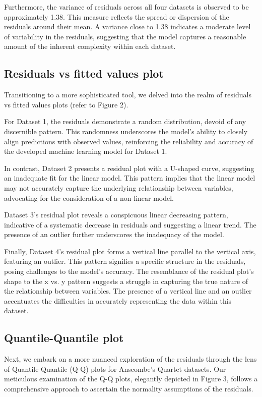 \documentclass[12pt,doublespace]{article}
\begin{document}
	Furthermore, the variance of residuals across all four datasets is observed to be approximately 1.38. This measure reflects the spread or dispersion of the residuals around their mean. A variance close to 1.38 indicates a moderate level of variability in the residuals, suggesting that the model captures a reasonable amount of the inherent complexity within each dataset. 
	
	\subsection{Residuals vs fitted values plot}
	Transitioning to a more sophisticated tool, we delved into the realm of residuals vs fitted values plots (refer to Figure 2).
	
	For Dataset 1, the residuals demonstrate a random distribution, devoid of any discernible pattern. This randomness underscores the model's ability to closely align predictions with observed values, reinforcing the reliability and accuracy of the developed machine learning model for Dataset 1.
	
	In contrast, Dataset 2 presents a residual plot with a U-shaped curve, suggesting an inadequate fit for the linear model. This pattern implies that the linear model may not accurately capture the underlying relationship between variables, advocating for the consideration of a non-linear model.
	
	Dataset 3's residual plot reveals a conspicuous linear decreasing pattern, indicative of a systematic decrease in residuals and suggesting a linear trend. The presence of an outlier further underscores the inadequacy of the model.
	
	Finally, Dataset 4's residual plot forms a vertical line parallel to the vertical axis, featuring an outlier. This pattern signifies a specific structure in the residuals, posing challenges to the model's accuracy. The resemblance of the residual plot's shape to the x vs. y pattern suggests a struggle in capturing the true nature of the relationship between variables. The presence of a vertical line and an outlier accentuates the difficulties in accurately representing the data within this dataset. 

\subsection{Quantile-Quantile plot}
	Next, we embark on a more nuanced exploration of the residuals through the lens of Quantile-Quantile (Q-Q) plots for Anscombe's Quartet datasets. Our meticulous examination of the Q-Q plots, elegantly depicted in Figure 3, follows a comprehensive approach to ascertain the normality assumptions of the residuals.
		
\end{document}

